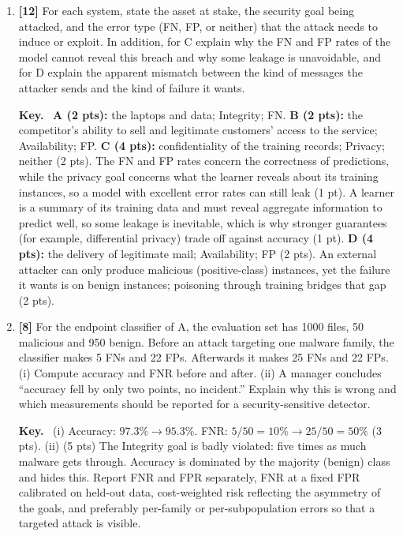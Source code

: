 \documentclass[10pt,a4paper]{extarticle}
\newcommand{\pts}[1]{\textbf{\color{accent}[#1]}\enspace}
\newenvironment{sol}{\par\smallskip
    \begin{tcolorbox}[colback=accent!6, colframe=accent, boxrule=0.5pt, arc=1pt,
                      left=5pt, right=5pt, top=2pt, bottom=2pt, breakable, fontupper=\small]
    \textbf{\color{accent}Key.}\ }{\end{tcolorbox}\par}
\begin{document}
\begin{enumerate}[label=(\alph*)]
\item \pts{12} For each system, state the asset at stake, the security goal being attacked, and the error type (FN, FP, or neither) that the attack needs to induce or exploit. In addition, for C explain why the FN and FP rates of the model cannot reveal this breach and why some leakage is unavoidable, and for D explain the apparent mismatch between the kind of messages the attacker sends and the kind of failure it wants.

\begin{sol}
\textbf{A (2 pts):} the laptops and data; Integrity; FN. \textbf{B (2 pts):} the competitor's ability to sell and legitimate customers' access to the service; Availability; FP. \textbf{C (4 pts):} confidentiality of the training records; Privacy; neither (2 pts). The FN and FP rates concern the correctness of predictions, while the privacy goal concerns what the learner reveals about its training instances, so a model with excellent error rates can still leak (1 pt). A learner is a summary of its training data and must reveal aggregate information to predict well, so some leakage is inevitable, which is why stronger guarantees (for example, differential privacy) trade off against accuracy (1 pt). \textbf{D (4 pts):} the delivery of legitimate mail; Availability; FP (2 pts). An external attacker can only produce malicious (positive-class) instances, yet the failure it wants is on benign instances; poisoning through training bridges that gap (2 pts).
\end{sol}

\item \pts{8} For the endpoint classifier of A, the evaluation set has 1000 files, 50 malicious and 950 benign. Before an attack targeting one malware family, the classifier makes 5 FNs and 22 FPs. Afterwards it makes 25 FNs and 22 FPs. (i) Compute accuracy and FNR before and after. (ii) A manager concludes ``accuracy fell by only two points, no incident.'' Explain why this is wrong and which measurements should be reported for a security-sensitive detector.

\begin{sol}
(i) Accuracy: \(97.3\%\to 95.3\%\). FNR: \(5/50=10\%\to 25/50=50\%\) (3 pts). (ii) (5 pts) The Integrity goal is badly violated: five times as much malware gets through. Accuracy is dominated by the majority (benign) class and hides this. Report FNR and FPR separately, FNR at a fixed FPR calibrated on held-out data, cost-weighted risk reflecting the asymmetry of the goals, and preferably per-family or per-subpopulation errors so that a targeted attack is visible.
\end{sol}
\end{enumerate}
\end{document}
